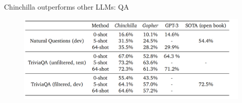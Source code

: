 
\begin{vbframe}{Chinchilla outperforms other LLM\MakeLowercase{s}: QA}

\vfill

\begin{figure}
	\centering
	\includegraphics[width = 12cm]{./figure/chinchilla_qa.png} \\ 
\end{figure}

\vfill

\end{vbframe}


\endlecture

